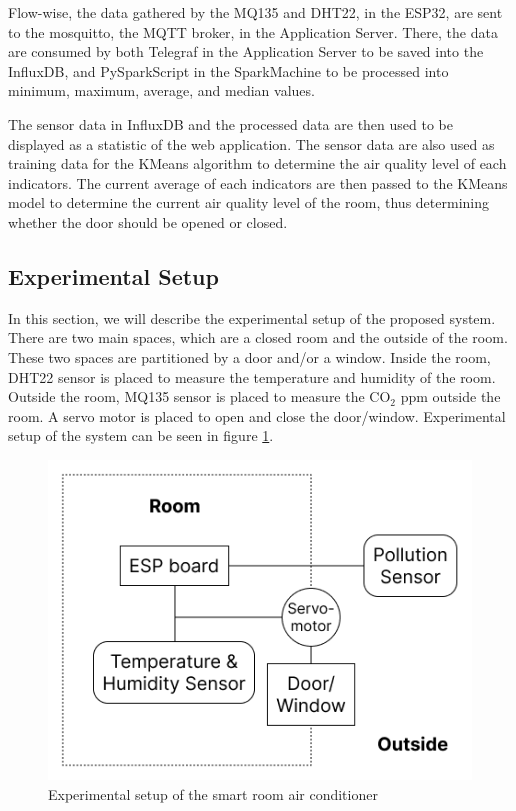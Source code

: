 Flow-wise, the data gathered by the MQ135 and DHT22, in the
ESP32, are sent to the mosquitto, the MQTT broker, in the
Application Server.
There, the data are consumed by both Telegraf in the
Application Server to be saved into the InfluxDB, and
PySparkScript in the SparkMachine to be processed into
minimum, maximum, average, and median values.

The sensor data in InfluxDB and the processed data are then
used to be displayed as a statistic of the web application.
The sensor data are also used as training data for the KMeans
algorithm to determine the air quality level of each
indicators. The current average of each indicators are then
passed to the KMeans model to determine the current air
quality level of the room, thus determining whether the door
should be opened or closed.

\subsection{Experimental Setup}
In this section, we will describe the experimental setup of the proposed system.
There are two main spaces, which are a closed room and the outside of the room.
These two spaces are partitioned by a door and/or a window. Inside the room,
DHT22 sensor is placed to measure the temperature and humidity of the room.
Outside the room, MQ135 sensor is placed to measure the CO$_2$ ppm outside the room.
A servo motor is placed to open and close the door/window.
Experimental setup of the system can be seen in figure \ref{setup}.

\begin{figure}
    \centerline{\includegraphics[scale=0.2]{resources/setup.png}}
    \caption{Experimental setup of the smart room air conditioner}
    \label{setup}
\end{figure}

